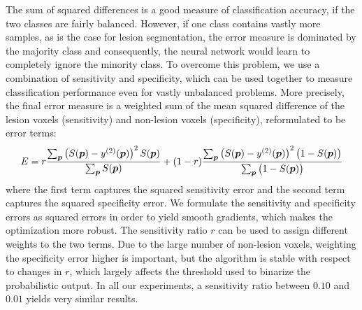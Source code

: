 The sum of squared differences is a good measure of classification accuracy, if
the two classes are fairly balanced. However, if one class contains vastly more
samples, as is the case for lesion segmentation, the error measure is dominated
by the majority class and consequently, the neural network would learn to
completely ignore the minority class. To overcome this problem, we use a
combination of sensitivity and specificity, which can be used together to
measure classification performance even for vastly unbalanced problems. More
precisely, the final error measure is a weighted sum of the mean squared
difference of the lesion voxels (sensitivity) and non-lesion voxels
(specificity), reformulated to be error terms:
\begin{equation} 
E = r\frac{\textstyle\sum_{\vect{p}} \left(S(\vect{p}) -
y^{(2)}(\vect{p})\right)^2 S(\vect{p})}{\textstyle\sum_{\vect{p}} S(\vect{p})}
  +
(1-r)\frac{\textstyle\sum_{\vect{p}} \left(S(\vect{p}) -
y^{(2)}(\vect{p})\right)^2 \big(1 - S(\vect{p})\big)}{%
\textstyle\sum_{\vect{p}}\big(1 - S(\vect{p})\big)}
\end{equation}
where the first term captures the squared sensitivity error and the second term
captures the squared specificity error. We formulate the sensitivity and
specificity errors as squared errors in order to yield smooth gradients, which
makes the optimization more robust. The sensitivity ratio $r$ can be used to
assign different weights to the two terms. Due to the large number of non-lesion
voxels, weighting the specificity error higher is important, but the algorithm
is stable with respect to changes in $r$, which largely affects the threshold
used to binarize the probabilistic output. In all our experiments, a sensitivity
ratio between $0.10$ and $0.01$ yields very similar results.

